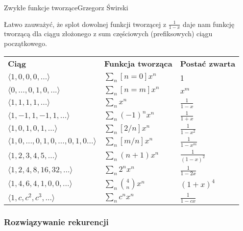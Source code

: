 \begin{referat}{Zwykłe funkcje tworzące}{Grzegorz Świrski}
\begin{teoria}
Łatwo zauważyć, że splot dowolnej funkcji tworzącej z $\frac{1}{1-x}$
daje nam funkcję tworzącą dla ciągu złożonego z sum częściowych (prefiksowych)
ciągu początkowego.

\begin{center}
  \begin{tabular}{ l l l }
    \textbf{Ciąg} & \textbf{Funkcja tworząca} & \textbf{Postać zwarta} \\
    $\displaystyle \langle 1,0,0,0,... \rangle $ & $\displaystyle \sum_n [n=0]x^n $ & 1 \\
    $\displaystyle \langle 0,...,0,1,0,... \rangle $ & $\displaystyle \sum_n [n=m]x^n $ & $\displaystyle x^m$ \\
    $\displaystyle \langle 1,1,1,1,... \rangle $ & $\displaystyle \sum_n x^n $ & $\displaystyle \frac{1}{1-x}$ \\
    $\displaystyle \langle 1, -1, 1, -1, 1,... \rangle $ & $\displaystyle \sum_n (-1)^nx^n $ & $\displaystyle \frac{1}{1+x}$ \\
    $\displaystyle \langle 1,0,1,0,1,... \rangle $ & $\displaystyle \sum_n [2/n]x^n $ & $\displaystyle \frac{1}{1-x^2}$ \\
    $\displaystyle \langle 1,0,...,0,1,0,...,0,1,0... \rangle $ & $\displaystyle \sum_n [m/n]x^n $ & $\displaystyle \frac{1}{1-x^m}$ \\
    $\displaystyle \langle 1,2,3,4,5,... \rangle $ & $\displaystyle \sum_n (n+1)x^n $ & $\displaystyle \frac{1}{(1-x)^2}$ \\
    $\displaystyle \langle 1,2,4,8,16,32,... \rangle $ & $\displaystyle \sum_n 2^n x^n $ & $\displaystyle \frac{1}{1-2x}$ \\
    $\displaystyle \langle 1,4,6,4,1,0,0,... \rangle $ & $\displaystyle \sum_n {4 \choose n} x^n $ & $\displaystyle (1+x)^4$ \\
    $\displaystyle \langle 1,c,c^2,c^3,... \rangle $ & $\displaystyle \sum_n c^n x^n $ & $\displaystyle \frac{1}{1-cx}$
  \end{tabular}
\end{center}


\subsubsection{Rozwiązywanie rekurencji}


\end{teoria}
\end{referat}
